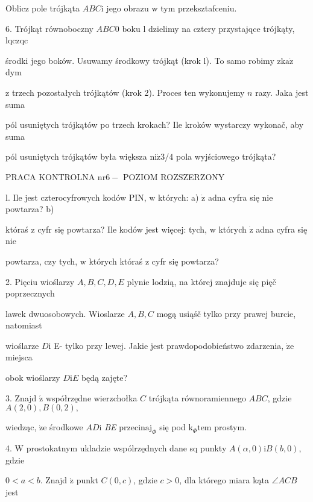 \documentclass[a4paper,12pt]{article}
\begin{document}
Oblicz pole trójkąta $ABC\mathrm{i}$ jego obrazu $\mathrm{w}$ tym przeksztafceniu.

6. Trójkąt równoboczny $ABC 0$ boku l dzielimy na cztery przystajqce trójkąty, lqczqc

środki jego boków. Usuwamy środkowy trójkąt (krok l). To samo robimy $\mathrm{z} \mathrm{k}\mathrm{a}\dot{\mathrm{z}}$ dym

$\mathrm{z}$ trzech pozostałych trójkątów (krok 2). Proces ten wykonujemy $n$ razy. Jaka jest suma

pól usuniętych trójkątów po trzech krokach? Ile kroków wystarczy wykonač, aby suma

pól usuniętych trójkątów była większa $\mathrm{n}\mathrm{i}\dot{\mathrm{z}}3/4$ pola wyjściowego trójkąta?




PRACA KONTROLNA $\mathrm{n}\mathrm{r} 6-$ POZIOM ROZSZERZONY

l. Ile jest czterocyfrowych kodów PIN, $\mathrm{w}$ których: a) $\dot{\mathrm{z}}$ adna cyfra się nie powtarza? b)

któraś $\mathrm{z}$ cyfr się powtarza? Ile kodów jest więcej: tych, $\mathrm{w}$ których $\dot{\mathrm{z}}$ adna cyfra się nie

powtarza, czy tych, $\mathrm{w}$ których któraś $\mathrm{z}$ cyfr się powtarza?

2. Pięciu wioślarzy $A, B, C, D, E$ plynie lodzią, na której znajduje się pięč poprzecznych

lawek dwuosobowych. Wioslarze $A, B, C$ mogą usiąśč tylko przy prawej burcie, natomiast

wioślarze $D\mathrm{i}$ E- tylko przy lewej. Jakie jest prawdopodobieństwo zdarzenia, $\dot{\mathrm{z}}\mathrm{e}$ miejsca

obok wioślarzy $D\mathrm{i}E$ będą zajęte?

3. Znajd $\acute{\mathrm{z}}$ współrzędne wierzchołka $C$ trójkąta równoramiennego $ABC$, gdzie $A(2,0), B(0,2),$

wiedząc, $\dot{\mathrm{z}}\mathrm{e}$ środkowe $AD\mathrm{i}$ {\it BE} $\mathrm{p}\mathrm{r}\mathrm{z}\mathrm{e}\mathrm{c}\mathrm{i}\mathrm{n}\mathrm{a}\mathrm{j}_{\Phi}$ się pod $\mathrm{k}_{\Phi}\mathrm{t}\mathrm{e}\mathrm{m}$ prostym.

4. $\mathrm{W}$ prostokatnym ukladzie wspólrzędnych dane sq punkty $A(\alpha,0)\mathrm{i}B(b,0)$, gdzie

$0 < a < b.$ Znajd $\acute{\mathrm{z}}$ punkt $C(0,c)$, gdzie $c > 0$, dla którego miara kąta $\angle ACB$ jest
\end{document}
